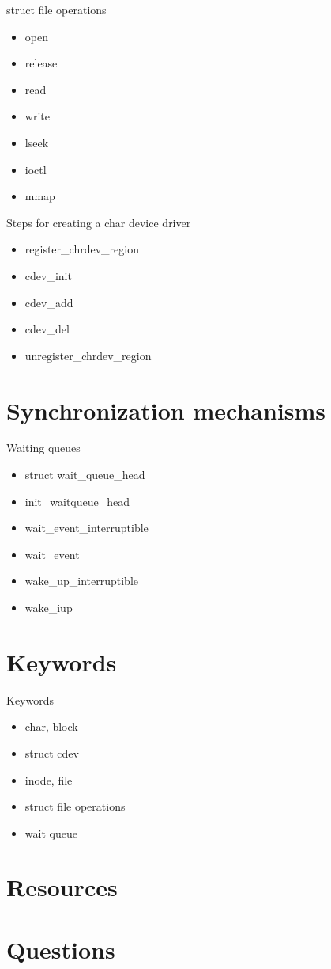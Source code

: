 \documentclass{workshop}
\begin{document}
\begin{frame}{struct file operations}
      \begin{itemize}
	\item open
	\item release
	\item read
	\item write
	\item lseek
	\item ioctl
	\item mmap
      \end{itemize}
\end{frame}

\begin{frame}{Steps for creating a char device driver}
      \begin{itemize}
        \item register_chrdev_region
	\item cdev_init
	\item cdev_add
	\item cdev_del
	\item unregister_chrdev_region
      \end{itemize}
\end{frame}

\section{Synchronization mechanisms}
\begin{frame}{Waiting queues}
      \begin{itemize}
        \item struct wait_queue_head
	\item init_waitqueue_head
	\item wait_event_interruptible
	\item wait_event
	\item wake_up_interruptible
	\item wake_iup
      \end{itemize}
\end{frame}


\section{Keywords}
\begin{frame}{Keywords}
      \begin{itemize}
        \item char, block
	\item struct cdev
	\item inode, file
	\item struct file operations
	\item wait queue
      \end{itemize}
\end{frame}

\section{Resources}

\section{Questions}
\end{document}
